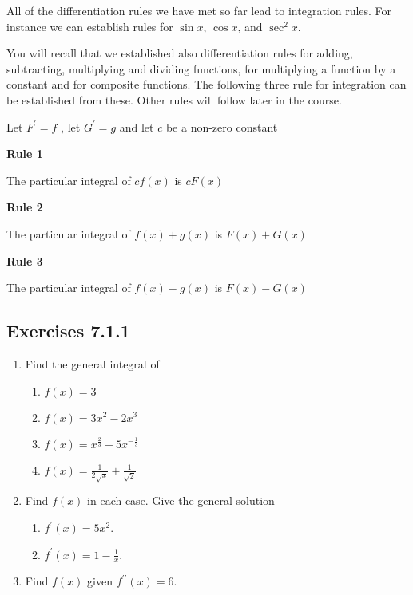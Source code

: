 All of the differentiation rules we have met so far
lead to integration rules. For instance we can establish rules for $\sin  x$, $\cos  x$, and $\sec ^{2} x\text{.}$ 

You will recall that we established also differentiation rules for adding, subtracting, multiplying
and dividing functions, for multiplying a function by a constant and for composite functions. The following
three rule for integration can be established from these. Other rules will follow later in the course.


 Let $F^{ \prime } =f$ , let $G^{ \prime } =g$ and let $c$ be a non-zero constant 

\textbf{Rule 1} 

The particular integral of $c f (x)$ is $c F (x)$ 

\textbf{Rule 2} 

The particular integral of $f (x) +g (x)$ is $F (x) +G (x)$ 

\textbf{Rule 3} 

The particular integral of $f (x) -g (x)$ is $F (x) -G (x)$ 

\subsection{Exercises 7.1.1}
\begin{enumerate}
\item Find the general integral of 


\begin{enumerate}
\item $f (x) =3$ 

\item $f (x) =3 x^{2} -2 x^{3}$ 

\item $f (x) =x^{\frac{2}{3}} -5 x^{ -\frac{1}{3}}$ 

\item $f (x) =\frac{1}{2 \sqrt{x}} +\frac{1}{\sqrt{2}}$ \end{enumerate}


\item Find $f (x)$ in each case. Give the general solution 


\begin{enumerate}
\item $f^{ \prime } (x) =5 x^{2}$. 

\item $f^{ \prime } (x) =1 -\frac{1}{x}$. \end{enumerate}


\item Find $f (x)$ given $f^{ \prime  \prime } (x) =6$. \end{enumerate}



